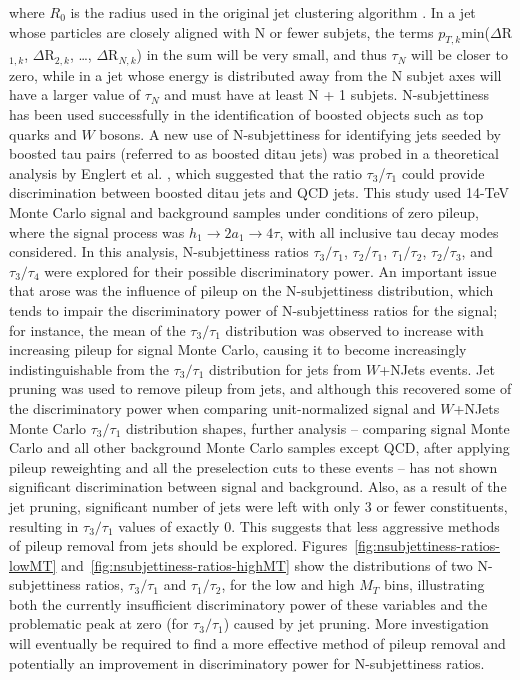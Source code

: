 \noindent where $R_{0}$ is the radius used in the original jet clustering algorithm \cite{Thaler:2010tr}.\newline
In a jet whose particles are closely aligned with N or fewer subjets, the terms $p_{T,k}$min($\Delta$R$_{1,k}$, $\Delta$R$_{2,k}$, \dots, $\Delta$R$_{N,k}$) in the sum will be very small, and thus $\tau_{N}$ will be closer to zero, while in a jet whose energy is distributed away from the N subjet axes will have a larger value of $\tau_{N}$ and must have at least N + 1 subjets.\newline
N-subjettiness has been used successfully in the identification of boosted objects such as top quarks and $W$ bosons. A new use of N-subjettiness for identifying jets seeded by boosted tau pairs (referred to as boosted ditau jets) was probed in a theoretical analysis by Englert et al. \cite{Englert:2011iz}, which suggested that the ratio $\tau_{3}$/$\tau_{1}$ could provide discrimination between boosted ditau jets and QCD jets. This study used 14-TeV Monte Carlo signal and background samples under conditions of zero pileup, where the signal process was  $h_{1}\rightarrow 2a_{1}\rightarrow 4\tau$, with all inclusive tau decay modes considered.\newline
In this analysis, N-subjettiness ratios $\tau_{3}/\tau_{1}$, $\tau_{2}/\tau_{1}$, $\tau_{1}/\tau_{2}$, $\tau_{2}/\tau_{3}$, and $\tau_{3}/\tau_{4}$  were explored for their possible discriminatory power. An important issue that arose was the influence of pileup on the N-subjettiness distribution, which tends to impair the discriminatory power of N-subjettiness ratios for the signal; for instance, the mean of the $\tau_{3}/\tau_{1}$ distribution was observed to increase with increasing pileup for signal Monte Carlo, causing it to become increasingly indistinguishable from the $\tau_{3}/\tau_{1}$ distribution for jets from $W$+NJets events. Jet pruning was used to remove pileup from jets, and although this recovered some of the discriminatory power when comparing unit-normalized signal and $W$+NJets Monte Carlo $\tau_{3}/\tau_{1}$ distribution shapes, further analysis -- comparing signal Monte Carlo and all other background Monte Carlo samples except QCD, after applying pileup reweighting and all the preselection cuts to these events -- has not shown significant discrimination between signal and background. Also, as a result of the jet pruning, significant number of jets were left with only 3 or fewer constituents, resulting in $\tau_{3}/\tau_{1}$ values of exactly 0. This suggests that less aggressive methods of pileup removal from jets should be explored. Figures~\ref{fig:nsubjettiness-ratios-lowMT} and~\ref{fig:nsubjettiness-ratios-highMT} show the distributions of two N-subjettiness ratios, $\tau_{3}/\tau_{1}$ and $\tau_{1}/\tau_{2}$, for the low and high $M_{T}$ bins, illustrating both the currently insufficient discriminatory power of these variables and the problematic peak at zero (for $\tau_{3}/\tau_{1}$) caused by jet pruning. More investigation will eventually be required to find a more effective method of pileup removal and potentially an improvement in discriminatory power for N-subjettiness ratios.

